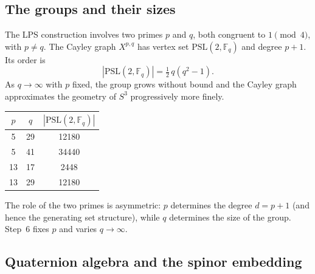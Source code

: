 \documentclass[11pt,a4paper]{article}
\begin{document}
  \subsection{The groups and their sizes}
    \label{sec:step6a-group}

    The LPS construction involves two primes $p$ and $q$, both congruent to
    $1 \pmod{4}$, with $p \neq q$.
    The Cayley graph $X^{p,q}$ has vertex set $\mathrm{PSL}(2,\mathbb{F}_q)$
    and degree $p + 1$.
    Its order is
    \begin{equation}
      |\mathrm{PSL}(2,\mathbb{F}_q)| = \tfrac{1}{2}\,q(q^2-1).
      \label{eq:PSL2-order}
    \end{equation}
    As $q \to \infty$ with $p$ fixed, the group grows without bound and the
    Cayley graph approximates the geometry of $S^3$ progressively more finely.

    \medskip
    \begin{center}
      \renewcommand{\arraystretch}{1.2}
      \begin{tabular}{ccc}
        \hline
        $p$ & $q$ & $|\mathrm{PSL}(2,\mathbb{F}_q)|$ \\
        \hline
        5 & 29 & 12180 \\
        5 & 41 & 34440 \\
        13 & 17 & 2448  \\
        13 & 29 & 12180 \\
        \hline
      \end{tabular}
    \end{center}

    \medskip\noindent
    The role of the two primes is asymmetric: $p$ determines the degree
    $d = p+1$ (and hence the generating set structure), while $q$ determines
    the size of the group.
    Step~6 fixes $p$ and varies $q \to \infty$.

  \subsection{Quaternion algebra and the spinor embedding}
    \label{sec:step6a-quat}
\end{document}
